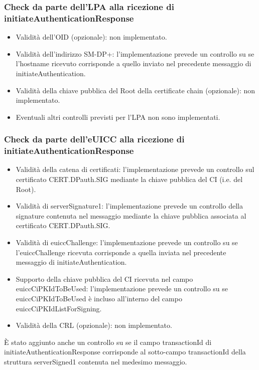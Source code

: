 \documentclass[10pt, oneside]{book}
\begin{document}
\subsubsection{Check da parte dell'LPA alla ricezione di initiateAuthenticationResponse}
\begin{itemize}
\item Validità dell'OID (opzionale): non implementato.
\item Validità dell'indirizzo SM-DP+: l'implementazione prevede un controllo su se l'hostname ricevuto corrisponde a quello inviato nel precedente messaggio di initiateAuthentication.
\item Validità della chiave pubblica del Root della certificate chain (opzionale): non implementato.
\item Eventuali altri controlli previsti per l'LPA non sono implementati.
\end{itemize}

\subsubsection{Check da parte dell'eUICC alla ricezione di initiateAuthenticationResponse}
\begin{itemize}
\item Validità della catena di certificati: l'implementazione prevede un controllo sul certificato CERT.DPauth.SIG mediante la chiave pubblica del CI (i.e. del Root).
\item Validità di serverSignature1: l'implementazione prevede un controllo della signature contenuta nel messaggio mediante la chiave pubblica associata al certificato CERT.DPauth.SIG.
\item Validità di euiccChallenge: l'implementazione prevede un controllo su se l'euiccChallenge ricevuta corrisponde a quella inviata nel precedente messaggio di initiateAuthentication.
\item Supporto della chiave pubblica del CI ricevuta nel campo euiccCiPKIdToBeUsed: l'implementazione prevede un controllo su se euiccCiPKIdToBeUsed è incluso all'interno del campo euiccCiPKIdListForSigning.
\item Validità della CRL (opzionale): non implementato.
\end{itemize}
È stato aggiunto anche un controllo su se il campo transactionId di initiateAuthenticationResponse corrisponde al sotto-campo transactionId della struttura serverSigned1 contenuta nel medesimo messaggio.
\end{document}
